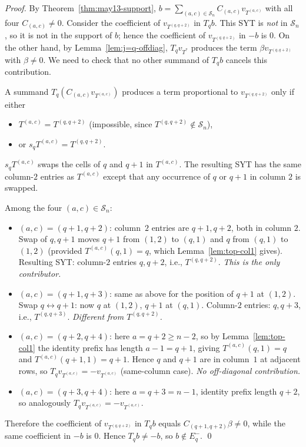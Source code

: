 \documentclass[11pt]{article}
\theoremstyle{definition}
\begin{document}
\begin{proof}
By Theorem~\ref{thm:may13-support}, $b = \sum_{(a,c)\in\mathcal{S}_n}
C_{(a,c)} v_{T^{(a,c)}}$ with all four $C_{(a,c)} \ne 0$.  Consider
the coefficient of $v_{T^{(q, q+2)}}$ in $T_q b$.  This SYT is
\emph{not} in $\mathcal{S}_n$, so it is not in the support of $b$;
hence the coefficient of $v_{T^{(q, q+2)}}$ in $-b$ is $0$.  On
the other hand, by Lemma~\ref{lem:j=q-offdiag},
$T_q v_{T^*}$ produces the term $\beta v_{T^{(q,q+2)}}$ with
$\beta \ne 0$.  We need to check that no other summand of $T_q b$
cancels this contribution.

A summand $T_q (C_{(a,c)} v_{T^{(a,c)}})$ produces a term proportional
to $v_{T^{(q, q+2)}}$ only if either
\begin{itemize}[topsep=0.3em,itemsep=0.1em]
\item $T^{(a,c)} = T^{(q, q+2)}$ (impossible, since
  $T^{(q,q+2)} \notin \mathcal{S}_n$),
\item or $s_q T^{(a,c)} = T^{(q, q+2)}$.
\end{itemize}
$s_q T^{(a,c)}$ swaps the cells of $q$ and $q+1$ in $T^{(a,c)}$.
The resulting SYT has the same column-$2$ entries as $T^{(a,c)}$
except that any occurrence of $q$ or $q+1$ in column $2$ is swapped.

Among the four $(a,c) \in \mathcal{S}_n$:
\begin{itemize}[topsep=0.3em,itemsep=0.1em]
\item $(a,c) = (q+1, q+2)$: column~$2$ entries are $q+1, q+2$, both in
  column $2$.  Swap of $q,q+1$ moves $q+1$ from $(1,2)$ to $(q,1)$ and
  $q$ from $(q,1)$ to $(1,2)$ (provided $T^{(a,c)}(q,1) = q$, which
  Lemma~\ref{lem:top-col1} gives).  Resulting SYT: column-$2$ entries
  $q, q+2$, i.e., $T^{(q, q+2)}$.  \emph{This is the only contributor.}
\item $(a,c) = (q+1, q+3)$: same as above for the position of $q+1$
  at $(1,2)$.  Swap $q \leftrightarrow q+1$: now $q$ at $(1,2)$,
  $q+1$ at $(q,1)$.  Column-$2$ entries: $q, q+3$, i.e., $T^{(q, q+3)}$.
  \emph{Different from $T^{(q, q+2)}$.}
\item $(a,c) = (q+2, q+4)$: here $a = q+2 \ge n-2$, so by
  Lemma~\ref{lem:top-col1} the identity prefix has length $a - 1 = q+1$,
  giving $T^{(a,c)}(q, 1) = q$ and $T^{(a,c)}(q+1, 1) = q+1$.  Hence
  $q$ and $q+1$ are in column~$1$ at adjacent rows, so
  $T_q v_{T^{(a,c)}} = -v_{T^{(a,c)}}$ (same-column case).  \emph{No
  off-diagonal contribution.}
\item $(a,c) = (q+3, q+4)$: here $a = q + 3 = n - 1$, identity prefix
  length $q + 2$, so analogously $T_q v_{T^{(a,c)}} = -v_{T^{(a,c)}}$.
\end{itemize}

Therefore the coefficient of $v_{T^{(q, q+2)}}$ in $T_q b$ equals
$C_{(q+1, q+2)} \beta \ne 0$, while the same coefficient in $-b$ is
$0$.  Hence $T_q b \ne -b$, so $b \notin E_q^-$.
\qed
\end{proof}
\end{document}
